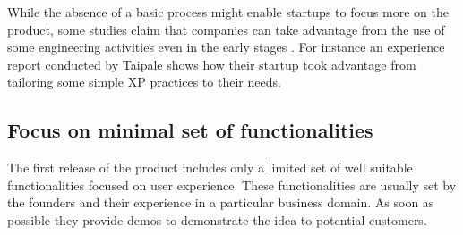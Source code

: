 \documentclass[10pt,journal,letterpaper,compsoc]{IEEEtran}
\begin{document}
While the absence of a basic process might enable startups to focus more on the product, some studies claim that companies can take advantage from the use of some engineering activities even in the early stages \cite{989006}. For instance an experience report conducted by Taipale \cite{Taipale2010} shows how their startup took advantage from tailoring some simple XP practices to their needs. 

\subsection{Focus on minimal set of functionalities} 
The first release of the product includes only a limited set of well suitable 
functionalities focused on user experience. These functionalities are 
usually set by the founders and their experience in a particular business 
domain. As soon as possible they provide demos to demonstrate the idea to 
potential customers. 
\end{document}
